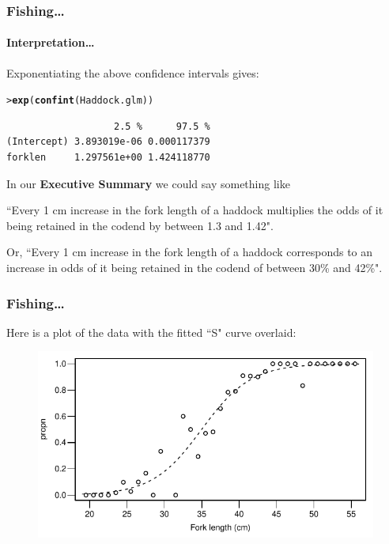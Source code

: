 \documentclass{beamer}\usepackage[]{graphicx}\usepackage[]{xcolor}
\makeatletter
\newcommand{\hlstd}[1]{\textcolor[rgb]{0.345,0.345,0.345}{#1}}%
\newcommand{\hlkwd}[1]{\textcolor[rgb]{0.737,0.353,0.396}{\textbf{#1}}}%
\newenvironment{kframe}{%
 \def\at@end@of@kframe{}%
 \ifinner\ifhmode%
  \def\at@end@of@kframe{\end{minipage}}%
  \begin{minipage}{\columnwidth}%
 \fi\fi%
 \def\FrameCommand##1{\hskip\@totalleftmargin \hskip-\fboxsep
 \colorbox{shadecolor}{##1}\hskip-\fboxsep
     \hskip-\linewidth \hskip-\@totalleftmargin \hskip\columnwidth}%
 \MakeFramed {\advance\hsize-\width
   \@totalleftmargin\z@ \linewidth\hsize
   \@setminipage}}%
 {\par\unskip\endMakeFramed%
 \at@end@of@kframe}
\newenvironment{knitrout}{}{} %
\makeatother
\begin{document}
\begin{frame}[fragile]
\frametitle{Fishing\ldots}
\framesubtitle{Interpretation\ldots}
Exponentiating the above confidence intervals gives:
\begin{knitrout}\scriptsize
{}\color{fgcolor}\begin{kframe}
\begin{alltt}
\hlstd{> }\hlkwd{exp}\hlstd{(}\hlkwd{confint}\hlstd{(Haddock.glm))}
\end{alltt}


{\ttfamily\noindent\itshape\color{messagecolor}{Waiting for profiling to be done...}}\begin{verbatim}
                   2.5 %      97.5 %
(Intercept) 3.893019e-06 0.000117379
forklen     1.297561e+00 1.424118770
\end{verbatim}
\end{kframe}
\end{knitrout}



\medskip

In our {\bf Executive Summary} we could say something like 
\medskip

``Every 1 cm increase in the fork length of a haddock multiplies the odds of it being retained in the codend by between 1.3 and 1.42".
\medskip

Or, ``Every 1 cm increase in the fork length of a haddock corresponds to an increase
in odds of it being retained in the codend of between 30\% and 42\%".
\end{frame}


\begin{frame}[fragile]
\frametitle{Fishing\ldots}

Here is a plot of the data with the fitted ``S" curve overlaid:


\begin{figure}
  \includegraphics{figure/RC-H15-046}
\end{figure}

\end{frame}
\end{document}
